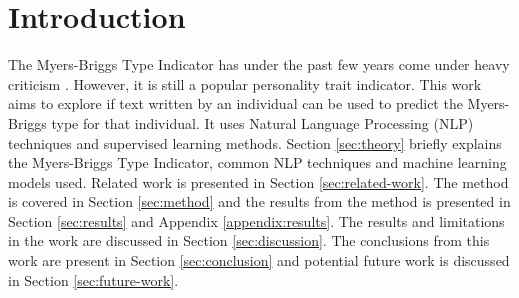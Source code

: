 \section{Introduction}

The Myers-Briggs Type Indicator has under the past few years come under heavy criticism \cite{pittenger1993, grant-mbti, rose-mbti, bbc-mbti, winkie-mbti}.
However, it is still a popular \cite{MBTI-trend} personality trait indicator.
This work aims to explore if text written by an individual can be used to predict the Myers-Briggs type for that individual.
It uses Natural Language Processing (NLP) techniques and supervised learning methods.
Section \ref{sec:theory} briefly explains the Myers-Briggs Type Indicator, common NLP techniques and machine learning models used.
Related work is presented in Section \ref{sec:related-work}.
The method is covered in Section \ref{sec:method} and the results from the method is presented in Section \ref{sec:results} and Appendix \ref{appendix:results}.
The results and limitations in the work are discussed in Section \ref{sec:discussion}.
The conclusions from this work are present in Section \ref{sec:conclusion} and potential future work is discussed in Section \ref{sec:future-work}.
